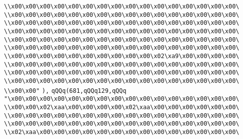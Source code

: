 \verb|\\x00\x00\x00\x00\x00\x00\x00\x00\x00\x00\x00\x00\x00\x00\x00\x00\|\newline
\verb|\\x00\x00\x00\x00\x00\x00\x00\x00\x00\x00\x00\x00\x00\x00\x00\x00\|\newline
\verb|\\x00\x00\x00\x00\x00\x00\x00\x00\x00\x00\x00\x00\x00\x00\x00\x00\|\newline
\verb|\\x00\x00\x00\x00\x00\x00\x00\x00\x00\x00\x00\x00\x00\x00\x00\x00\|\newline
\verb|\\x00\x00\x00\x00\x00\x00\x00\x00\x00\x00\x00\x00\x00\x00\x00\x00\|\newline
\verb|\\x00\x00\x00\x00\x00\x00\x00\x00\x00\x00\x00\x00\x00\x00\x00\x00\|\newline
\verb|\\x00\x00\x00\x00\x00\x00\x00\x00\x00\x00\x02\xa9\x00\x00\x00\x00\|\newline
\verb|\\x00\x00\x00\x00\x00\x00\x00\x00\x00\x00\x00\x00\x00\x00\x00\x00\|\newline
\verb|\\x00\x00\x00\x00\x00\x00\x00\x00\x00\x00\x00\x00\x00\x00\x00\x00\|\newline
\verb|\\x00\x00\x00\x00\x00\x00\x00\x00\x00\x00\x00\x00\x00\x00\x00\x00\|\newline
\verb|\\x00\x00"|\newline
\verb|),|\newline
\verb|qQQq(681,qQQq129,qQQq|\newline
\verb|"\x00\x00\x00\x00\x00\x00\x00\x00\x00\x00\x00\x00\x00\x00\x00\x00\|\newline
\verb|\\x00\x00\x02\xaa\x00\x00\x00\x00\x02\xaa\x00\x00\x00\x00\x00\x00\|\newline
\verb|\\x00\x00\x00\x00\x00\x00\x00\x00\x00\x00\x00\x00\x00\x00\x00\x00\|\newline
\verb|\\x00\x00\x00\x00\x00\x00\x00\x00\x00\x00\x00\x00\x00\x00\x00\x00\|\newline
\verb|\\x02\xaa\x00\x00\x00\x00\x00\x00\x00\x00\x00\x00\x00\x00\x00\x00\|\newline
